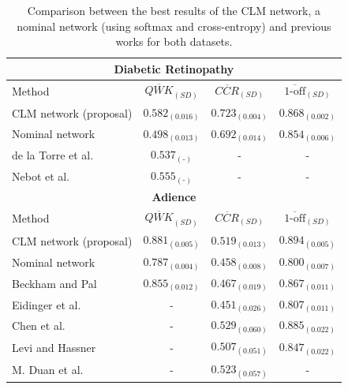 \documentclass[preprint]{elsarticle}
\begin{document}
\begin{table}[!t]
	\caption{Comparison between the best results of the CLM network, a nominal network (using softmax and cross-entropy) and previous works for both datasets.}
	\label{table:Comparison}
	\scriptsize
	\centering
	\def\arraystretch{1.3}
	\begin{tabular}{lccc}
		\hline\hline
		\multicolumn{4}{c}{\textbf{Diabetic Retinopathy}}\\
		\hline
		Method                                    & $\overline{QWK}_{(SD)}$ & $\overline{CCR}_{(SD)}$ & $\overline{\text{1-off}}_{(SD)}$ \\ \hline
		CLM network (proposal)                          &    $0.582_{(0.016)}$    &    $0.723_{(0.004)}$    &        $0.868_{(0.002)}$         \\
		Nominal network                           &    $0.498_{(0.013)}$    &    $0.692_{(0.014)}$    &        $0.854_{(0.006)}$         \\
		de la Torre et al. \cite{de2018weighted}     &  $0.537_{(\text{-})}$   &            -            &                -                 \\
		Nebot et al. \cite{nebot2016diabetic}  &  $0.555_{(\text{-})}$   &            -            &                -                 \\
		\hline
		\multicolumn{4}{c}{\textbf{Adience}}\\
		\hline
		Method                                    & $\overline{QWK}_{(SD)}$ & $\overline{CCR}_{(SD)}$ & $\overline{\text{1-off}}_{(SD)}$ \\ \hline
		CLM network (proposal)                          &    $0.881_{(0.005)}$    &    $0.519_{(0.013)}$    &        $0.894_{(0.005)}$         \\
		Nominal network                           &    $0.787_{(0.004)}$    &    $0.458_{(0.008)}$    &        $0.800_{(0.007)}$         \\
		Beckham and Pal \cite{beckham2017unimodal} &    $0.855_{(0.012)}$    &    $0.467_{(0.019)}$    &        $0.867_{(0.011)}$         \\
		Eidinger et al. \cite{eidinger2014age} &            -            &    $0.451_{(0.026)}$    &        $0.807_{(0.011)}$         \\
		Chen et al. \cite{chen2016cascaded} &            -            &    $0.529_{(0.060)}$    &        $0.885_{(0.022)}$         \\
		Levi and Hassner \cite{levi2015age}         &            -            &    $0.507_{(0.051)}$    &        $0.847_{(0.022)}$         \\ 
		M. Duan et al. \cite{duan2018hybrid}         &            -            &    $0.523_{(0.057)}$    &        -         \\ \hline\hline
	\end{tabular}
\end{table}
\end{document}

